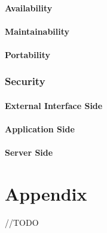\documentclass{report}
\begin{document}
			\subsubsection{Availability}

			\subsubsection{Maintainability}

			\subsubsection{Portability}

		\subsection{Security}

			\subsubsection{External Interface Side}

			\subsubsection{Application Side}

			\subsubsection{Server Side}

\chapter{Appendix}
//TODO
\end{document}
